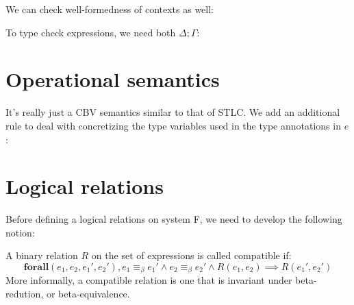\documentclass{notes}
\newcommand{\unit}{()}
\newcommand{\Unit}{\texttt{unit}}
\newcommand{\bequiv}{\equiv_{\beta}}
\begin{document}
We can check well-formedness of contexts as well:

To type check expressions, we need both $\Delta;\Gamma$:


\section{Operational semantics}
It's really just a CBV semantics similar to that of STLC. We add an additional rule to deal with concretizing the type variables used in the type annotations in $e$:
\begin{mathpar}
\end{mathpar}

\section{Logical relations}

Before defining a logical relations on system F, we need to develop the following notion:

\begin{defn}
  A binary relation $R$ on the set of expressions is called compatible if:
  \[\textbf{forall}(e_1,e_2,e_1',e_2'), e_1\bequiv e_1'\land e_2\bequiv e_2'\land R(e_1, e_2)\implies R(e_1',e_2')\]
  More informally, a compatible relation is one that is invariant under beta-redution, or beta-equivalence.
\end{defn}
\end{document}
